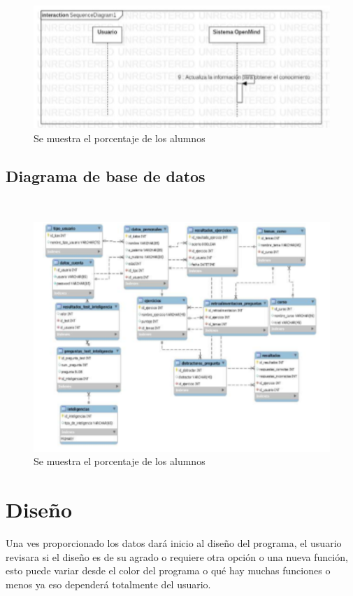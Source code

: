 \documentclass[letterpaper,oneside,openany,11pt]{book}
\begin{document}
\begin{figure}[H]
	\centering
	\includegraphics[width=1.0\textwidth]{./Imagenes/31}
	\caption{Se muestra el porcentaje de los alumnos}
\end{figure}

\subsection{Diagrama de base de datos}
\noindent \\

\begin{figure}[H]
	\centering
	\includegraphics[width=1.0\textwidth]{./Imagenes/32}
	\caption{Se muestra el porcentaje de los alumnos}
\end{figure}

\section{Diseño}
\noindent Una ves proporcionado los datos dará inicio al diseño del programa, el usuario revisara si el diseño es de su agrado o requiere otra opción o una nueva función, esto puede variar desde el color del programa o qué hay muchas funciones o menos ya eso dependerá totalmente del usuario.\\
 
\end{document}
